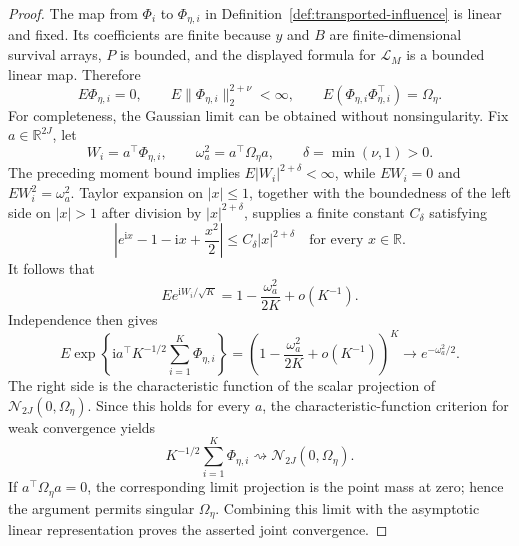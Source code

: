 \documentclass{article}
\begin{document}
\begin{proof}
The map from \(\Phi_i\) to \(\Phi_{\eta,i}\) in Definition~\ref{def:transported-influence} is linear and fixed. Its coefficients are finite because \(y\) and \(B\) are finite-dimensional survival arrays, \(P\) is bounded, and the displayed formula for \(\mathcal L_M\) is a bounded linear map. Therefore
\[
 E\Phi_{\eta,i}=0,
 \qquad
 E\|\Phi_{\eta,i}\|_2^{2+\nu}<\infty,
 \qquad
 E(\Phi_{\eta,i}\Phi_{\eta,i}^\top)=\Omega_\eta.
\]
For completeness, the Gaussian limit can be obtained without nonsingularity. Fix \(a\in\mathbb R^{2J}\), let
\[
 W_i=a^\top\Phi_{\eta,i},
 \qquad
 \omega_a^2=a^\top\Omega_\eta a,
 \qquad
 \delta=\min(\nu,1)>0.
\]
The preceding moment bound implies \(E|W_i|^{2+\delta}<\infty\), while \(EW_i=0\) and \(EW_i^2=\omega_a^2\). Taylor expansion on \(|x|\le1\), together with the boundedness of the left side on \(|x|>1\) after division by \(|x|^{2+\delta}\), supplies a finite constant \(C_\delta\) satisfying
\[
 \left|e^{\mathrm i x}-1-\mathrm i x+\frac{x^2}{2}\right|
 \le C_\delta |x|^{2+\delta}
 \quad\text{for every }x\in\mathbb R.
\]
It follows that
\[
 E e^{\mathrm iW_i/\sqrt K}
 =1-\frac{\omega_a^2}{2K}+o(K^{-1}).
\]
Independence then gives
\[
 E\exp\!\left\{\mathrm i a^\top K^{-1/2}
                   \sum_{i=1}^K\Phi_{\eta,i}\right\}
 =\left(1-\frac{\omega_a^2}{2K}+o(K^{-1})\right)^K
 \longrightarrow e^{-\omega_a^2/2}.
\]
The right side is the characteristic function of the scalar projection of \(\mathcal N_{2J}(0,\Omega_\eta)\). Since this holds for every \(a\), the characteristic-function criterion for weak convergence yields
\[
 K^{-1/2}\sum_{i=1}^K\Phi_{\eta,i}
 \rightsquigarrow \mathcal N_{2J}(0,\Omega_\eta).
\]
If \(a^\top\Omega_\eta a=0\), the corresponding limit projection is the point mass at zero; hence the argument permits singular \(\Omega_\eta\). Combining this limit with the asymptotic linear representation proves the asserted joint convergence.


\end{proof}
\end{document}
